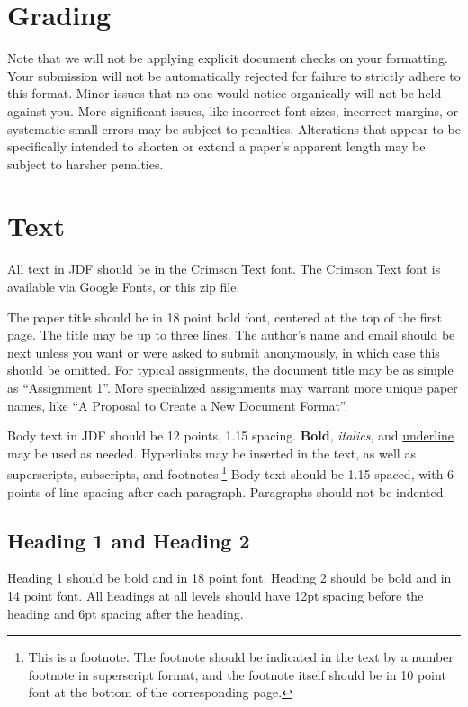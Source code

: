 {{{{\section*{Grading}
Note that we will not be applying explicit document checks on your formatting.
Your submission will not be automatically rejected for failure to strictly
adhere to this format. Minor issues that no one would notice organically will
not be held against you. More significant issues, like incorrect font sizes,
incorrect margins, or systematic small errors may be subject to penalties.
Alterations that appear to be specifically intended to shorten or extend a
paper's apparent length may be subject to harsher penalties.


\section*{Text}
All text in JDF should be in the Crimson Text font. The Crimson Text font is
available via Google Fonts, or this zip file.

The paper title should be in 18 point bold font, centered at the top of the
first page. The title may be up to three lines. The author's name and email
should be next unless you want or were asked to submit anonymously, in which
case this should be omitted. For typical assignments, the document title may be
as simple as ``Assignment 1''. More specialized assignments may warrant more
unique paper names, like ``A Proposal to Create a New Document Format''.

Body text in JDF should be 12 points, 1.15 spacing. \textbf{Bold},
\emph{italics}, and \underline{underline} may be used as needed. Hyperlinks may
be inserted in the text, as well as superscripts,
subscripts, and footnotes.\footnote{This is a footnote. The
footnote should be indicated in the text by a number footnote in superscript
format, and the footnote itself should be in 10 point font at the bottom of the
corresponding page.} Body text should be 1.15 spaced, with 6 points of line
spacing after each paragraph. Paragraphs should not be indented.


\subsection*{Heading 1 and Heading 2}
Heading 1 should be bold and in 18 point font. Heading 2 should be bold and in
14 point font. All headings at all levels should have 12pt spacing before the
heading and 6pt spacing after the heading.

}}}}
